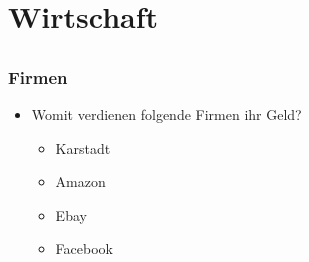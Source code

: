 \documentclass[12pt]{beamer}
\begin{document}
\begin{frame}
\begin{center}
{    }
  \end{center}
\end{frame}

\section{Wirtschaft}
\subsection{}

\begin{frame}
  \frametitle{Firmen}

  \begin{itemize}
    \item Womit verdienen folgende Firmen ihr Geld?
      \begin{itemize}
        \item<2-> Karstadt
        \item<3-> Amazon
        \item<4-> Ebay
        \item<5-> Facebook
      \end{itemize}
  \end{itemize}
\end{frame}
\end{document}
